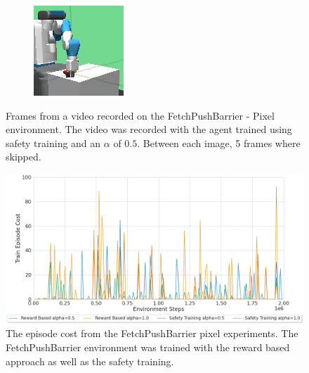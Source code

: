 \begin{figure}
\begin{subfigure}[b]{.19\textwidth}
    \end{subfigure}
    \begin{subfigure}[b]{.19\textwidth}
    \centering
    \includegraphics[width=\textwidth]{images/results/push-barrier-drq/frames/frame_4.png}
    \end{subfigure}
    \hfill
    \caption[Frames from a video recorded on the FetchPushBarrier - Pixel environment]{Frames from a video recorded on the FetchPushBarrier - Pixel environment. The video was recorded with the agent trained using safety training and an $\alpha$ of $0.5$. Between each image, 5 frames where skipped.}
    \label{fig:results:barrier-drq-frames}
\end{figure}

\begin{figure}[btp]
    \centering
    \includegraphics[width=\textwidth]{images/results/push-barrier-drq/cost.png}
    \caption[The episode cost from the FetchPushBarrier pixel experiments.]{The episode cost from the FetchPushBarrier pixel experiments. The FetchPushBarrier environment was trained with the reward based approach as well as the safety training.}
    \label{fig:results:barrier-drq-cost}
\end{figure}

